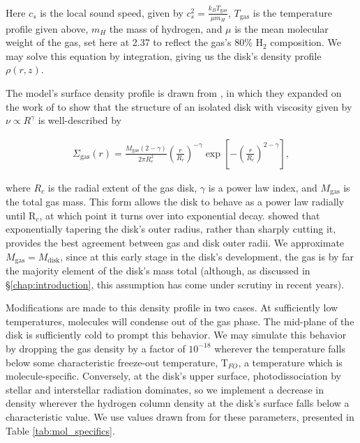 Here $c_s$ is the local sound speed, given by $c_s^2 = \frac{k_B T_\text{gas}}{\mu m_H}$, $T_\text{gas}$ is the temperature profile given above, $m_H$ the mass of hydrogen, and $\mu$ is the mean molecular weight of the gas, set here at 2.37 to reflect the gas's 80\% H$_2$ composition. We may solve this equation by integration, giving us the disk's density profile $\rho(r, z)$.


The model's surface density profile is drawn from \citet{Hartmann1998}, in which they expanded on the work of \citet{LyndenBell1974} to show that the structure of an isolated disk with viscosity given by $\nu \propto R^\gamma$ is well-described by



\begin{align}
  \Sigma_{\text{gas}}(r) = \frac{M_{\text{gas}} (2 - \gamma)}{2 \pi R_c^2} \left(\frac{r}{R_c} \right)^{-\gamma} \exp \left[-\left(\frac{r}{R_c} \right)^{2-\gamma} \right],
\end{align}

\noindent
where $R_c$ is the radial extent of the gas disk, $\gamma$ is a power law index, and $M_\text{gas}$ is the total gas mass. This form allows the disk to behave as a power law radially until R$_c$, at which point it turns over into exponential decay. \citet{Hughes2008} showed that exponentially tapering the disk's outer radius, rather than sharply cutting it, provides the best agreement between gas and disk outer radii. We approximate $M_\text{gas} = M_\text{disk}$, since at this early stage in the disk's development, the gas is by far the majority element of the disk's mass total (although, as discussed in \S\ref{chap:introduction}, this assumption has come under scrutiny in recent years).



Modifications are made to this density profile in two cases. At sufficiently low temperatures, molecules will condense out of the gas phase. The mid-plane of the disk is sufficiently cold to prompt this behavior. We may simulate this behavior by dropping the gas density by a factor of $10^{-18}$ wherever the temperature falls below some characteristic freeze-out temperature, T$_{FO}$, a temperature which is molecule-specific. Conversely, at the disk's upper surface, photodissociation by stellar and interstellar radiation dominates, so we implement a decrease in density wherever the hydrogen column density at the disk's surface falls below a characteristic value. We use values drawn from \cite{Factor2017} for these parameters, presented in Table \ref{tab:mol_specifics}.


